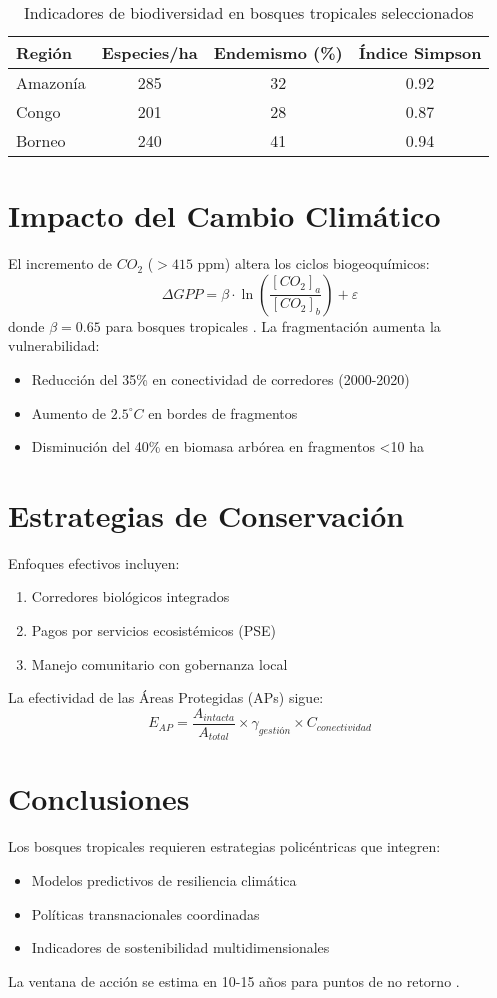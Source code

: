 \documentclass[12pt,a4paper]{article}
\begin{document}
\begin{table}[H]
\centering
\caption{Indicadores de biodiversidad en bosques tropicales seleccionados}
\label{tab:biodiversidad}
\begin{tabular}{@{}lccc@{}}
\toprule
\textbf{Región} & \textbf{Especies/ha} & \textbf{Endemismo (\%)} & \textbf{Índice Simpson} \\
\midrule
Amazonía & 285 & 32 & 0.92 \\
Congo & 201 & 28 & 0.87 \\
Borneo & 240 & 41 & 0.94 \\
\bottomrule
\end{tabular}
\end{table}

\section{Impacto del Cambio Climático}
El incremento de \(CO_2\) (\(>415\) ppm) altera los ciclos biogeoquímicos:
\[\Delta GPP = \beta \cdot \ln\left(\frac{[CO_2]_a}{[CO_2]_b}\right) + \varepsilon\]
donde \(\beta = 0.65\) para bosques tropicales \cite{hubau2020}. La fragmentación aumenta la vulnerabilidad:

\begin{itemize}[label=\textbullet]
\item Reducción del 35\% en conectividad de corredores (2000-2020)
\item Aumento de \(2.5^\circ C\) en bordes de fragmentos
\item Disminución del 40\% en biomasa arbórea en fragmentos <10 ha
\end{itemize}

\section{Estrategias de Conservación}
Enfoques efectivos incluyen:
\begin{enumerate}[label=(\arabic*)]
\item Corredores biológicos integrados
\item Pagos por servicios ecosistémicos (PSE)
\item Manejo comunitario con gobernanza local
\end{enumerate}

La efectividad de las Áreas Protegidas (APs) sigue:
\[E_{AP} = \frac{A_{intacta}}{A_{total}} \times \gamma_{gestión} \times C_{conectividad}\]

\section{Conclusiones}
Los bosques tropicales requieren estrategias policéntricas que integren:
\begin{itemize}[label=\textbullet]
\item Modelos predictivos de resiliencia climática
\item Políticas transnacionales coordinadas
\item Indicadores de sostenibilidad multidimensionales
\end{itemize}
La ventana de acción se estima en 10-15 años para puntos de no retorno \cite{lovejoy2019}.
\end{document}
